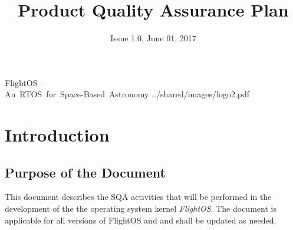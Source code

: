 

\title{Product Quality Assurance Plan}
\def \documentid {FLIGHTOS-UVIE-PAQ-001}
\date{Issue 1.0, June 01, 2017}

\newcommand\affil[1]{\textsuperscript#1}

\def\preparedby {Armin Luntzer\affil{1}}
\def\checkedby {Roland Ottensamer\affil{1}}
\def\approvedby {Franz Kerschbaum\affil{1}}
\def\authorisedby{-}

\def\affiliations{
	\affil{1} Department of Astrophysics, University of Vienna
}








 
\usepackage{multicol}
\usepackage{enumitem}
\usepackage{vhistory}

\usepackage{biblatex}








\setmainfont{MyriadPro-SemiCondensed}
\uvietitlepage%
{FlightOS --\\\mbox{An RTOS for Space-Based Astronomy}}%
{\doctitle}%
{../shared/images/logo2.pdf}{}
\setmainfont{MyriadPro}

\approvalpage

\tableofcontents
\newpage



\begin{versionhistory}
\end{versionhistory}


\chapter{Introduction}

\section{Purpose of the Document}


This document describes the \gls{SQA} activities that will be
performed in the development of the the operating system kernel \emph{FlightOS}.
The document is applicable for all versions of FlightOS and and shall be updated
as needed.\\

